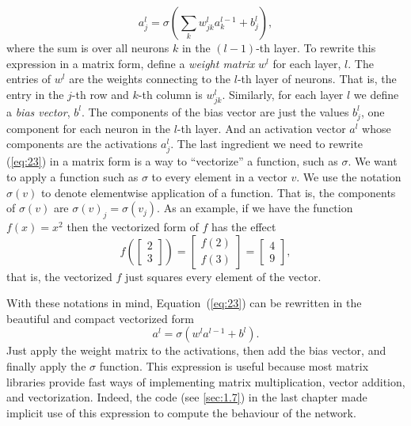 \documentclass[a4paper,twoside,10pt]{book}
\begin{document}
\begin{equation}
	a^{l}_j = \sigma\left( \sum_k w^{l}_{jk} a^{l-1}_k + b^l_j \right),\tag{23}\label{eq:23}
\end{equation}
where the sum is over all neurons $k$ in the $(l-1)$-th layer. To rewrite this expression in a matrix form, define a \textit{weight matrix} $w^l$ for each layer, $l$. The entries of $w^l$ are the weights connecting to the $l$-th layer of neurons. That is, the entry in the $j$-th row and $k$-th column is $w^l_{jk}$. Similarly, for each layer $l$ we define a \textit{bias vector}, $b^l$. The components of the bias vector are just the values $b^l_j$, one component for each neuron in the $l$-th layer. And an activation vector $a^l$ whose components are the activations $a^l_j$.
The last ingredient we need to rewrite (\ref{eq:23}) in a matrix form is a way to ``vectorize'' a function, such as $\sigma$. We want to apply a function such as $\sigma$ to every element in a vector $v$. We use the notation $\sigma(v)$ to denote elementwise application of a function. That is, the components of $\sigma(v)$ are $\sigma(v)_j = \sigma(v_j)$. As an example, if we have the function $f(x)=x^2$ then the vectorized form of $f$ has the effect
\begin{equation}
f\left(\left[ \begin{array}{c} 2 \\ 3 \end{array} \right] \right)
= \left[ \begin{array}{c} f(2) \\ f(3) \end{array} \right]
= \left[ \begin{array}{c} 4 \\ 9 \end{array} \right],
\tag{24}\label{eq:24}
\end{equation}
that is, the vectorized $f$ just squares every element of the vector.

With these notations in mind, Equation~(\ref{eq:23}) can be rewritten in the beautiful and compact vectorized form
\begin{equation}
a^{l} = \sigma(w^l a^{l-1}+b^l).
\tag{25}\label{eq:25}
\end{equation}
Just apply the weight matrix to the activations, then add the bias vector, and finally apply the $\sigma$ function. This expression is useful because most matrix libraries provide fast ways of implementing matrix multiplication, vector addition, and vectorization. Indeed, the code (see \ref{sec:1.7}) in the last chapter made implicit use of this expression to compute the behaviour of the network.
\end{document}
